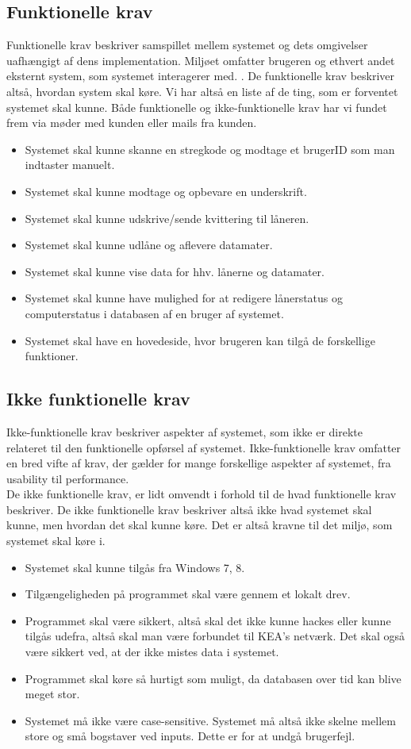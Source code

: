 \documentclass[a4paper]{article}
\begin{document}
\subsection{Funktionelle krav}
Funktionelle krav beskriver samspillet mellem systemet og dets omgivelser uafhængigt af dens implementation. Miljøet omfatter brugeren og ethvert andet eksternt system, som systemet interagerer med. \cite[p~125]{OOSE}. De funktionelle krav beskriver altså, hvordan system skal køre. Vi har altså en liste af de ting, som er forventet systemet skal kunne. Både funktionelle og ikke-funktionelle krav har vi fundet frem via møder med kunden eller mails fra kunden.
\begin{itemize}
	\item Systemet skal kunne skanne en stregkode og modtage et brugerID som man indtaster manuelt.
	\item Systemet skal kunne modtage og opbevare en underskrift.
	\item Systemet skal kunne udskrive/sende kvittering til låneren.
	\item Systemet skal kunne udlåne og aflevere datamater.
	\item Systemet skal kunne vise data for hhv. lånerne og datamater.
	\item Systemet skal kunne have mulighed for at redigere lånerstatus og computerstatus i databasen af en bruger af systemet.
	\item Systemet skal have en hovedeside, hvor brugeren kan tilgå de forskellige funktioner.
\end{itemize}
\newpage
\subsection{Ikke funktionelle krav}
Ikke-funktionelle krav beskriver aspekter af systemet, som ikke er direkte relateret til den funktionelle opførsel af systemet. Ikke-funktionelle krav omfatter en bred vifte af krav, der gælder for mange forskellige aspekter af systemet, fra usability til performance. \cite[p119]{OOSE} \\ De ikke funktionelle krav, er lidt omvendt i forhold til de hvad funktionelle krav beskriver. De ikke funktionelle krav beskriver altså ikke hvad systemet skal kunne, men hvordan det skal kunne køre. Det er altså kravne til det miljø, som systemet skal køre i.
\begin{itemize}
	\item Systemet skal kunne tilgås fra Windows 7, 8.
	\item Tilgængeligheden på programmet skal være gennem et lokalt drev.
	\item Programmet skal være sikkert, altså skal det ikke kunne hackes eller kunne tilgås udefra, altså skal man være forbundet til KEA's netværk. Det skal også være sikkert ved, at der ikke mistes data i systemet.
	\item Programmet skal køre så hurtigt som muligt, da databasen over tid kan blive meget stor.
	\item Systemet må ikke være case-sensitive. Systemet må altså ikke skelne mellem store og små bogstaver ved inputs. Dette er for at undgå brugerfejl.
\end{itemize}
\newpage
\end{document}
